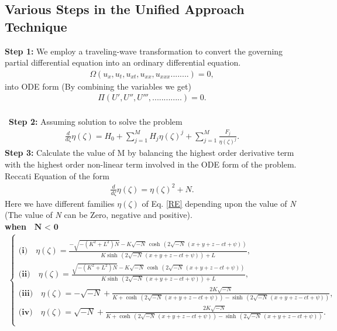 \documentclass[10pt]{NSP1}
\numberwithin{equation}{section}
\begin{document}
\subsection{Various Steps in the Unified Approach Technique}
\textbf{Step 1:}
We employ a traveling-wave transformation to convert the governing partial differential equation into an ordinary differential equation.
\begin{eqnarray}\label{PDE}
\Omega(u_x,u_t,u_{xt},u_{xx},u_{xxx}........)=0,
\end{eqnarray}
into ODE form (By combining the variables we get)
\begin{eqnarray}\label{ODE}
\Pi(U',U'',U''',.............)=0.
\end{eqnarray}\\\
\textbf{Step 2:}
Assuming solution to solve the problem
\begin{eqnarray}\label{TF}
\frac{d}{d \zeta}\eta \! \left(\zeta \right) =H_{0}+ \sum_{j=1}^M H_{j}\eta \left(\zeta \right)^{j}+\sum_{j=1}^M \frac{F_{j}}{\eta \left(\zeta \right)^{j}}.
\end{eqnarray}
\textbf{Step 3:}
Calculate the value of M by balancing the highest order derivative term with the highest order non-linear term involved in the ODE form of the problem.\\
Reccati Equation of the form
\begin{eqnarray}\label{RE}
\frac{d}{d \zeta}\eta \! \left(\zeta \right) =\eta \! \left(\zeta \right)^{2}+N.
\end{eqnarray}
Here we have different families ${\eta(\zeta)}$ of Eq. \ref{RE} depending upon the value of \emph{N} (The value of \emph{N} can be Zero, negative and positive).\\
\textbf{when $\textbf{ N $<$ 0} $ }
\begin{align}\label{FAM1}
\begin{cases}\\
\textbf{(i)}\quad \eta \! \left(\zeta \right) =\frac{-\sqrt{-\left(K^{2}+L^{2}\right) N}-K \sqrt{-N}\, \cosh \, \left(2 \sqrt{-N}\, \left(x+y+z-ct +\psi \right)\right)}{K \sinh \, \left(2 \sqrt{-N}\, \left(x+y+z-ct +\psi \right)\right)+L},\\
\textbf{(ii)}\quad \eta \! \left(\zeta \right) =\frac{\sqrt{-\left(K^{2}+L^{2}\right) N}-K \sqrt{-N}\, \cosh \, \left(2 \sqrt{-N}\, \left(x+y+z-ct +\psi \right)\right)}{K \sinh \, \left(2 \sqrt{-N}\, \left(x+y+z-ct +\psi \right)\right)+L},\\
\textbf{(iii)}\quad \eta \! \left(\zeta \right) =-\sqrt{-N}+\frac{2 K \sqrt{-N}}{K +\cosh \, \left(2 \sqrt{-N}\, \left(x+y+z-ct +\psi \right)\right)-\sinh \, \left(2 \sqrt{-N}\, \left(x+y+z-ct +\psi \right)\right)},\\
\textbf{(iv)}\quad \eta \! \left(\zeta \right) =\sqrt{-N}+\frac{2 K \sqrt{-N}}{K +\cosh \, \left(2 \sqrt{-N}\, \left(x+y+z-ct +\psi \right)\right)-\sinh \, \left(2 \sqrt{-N}\, \left(x+y+z-ct +\psi \right)\right)}.\\
\end{cases}
\end{align}
\end{document}
